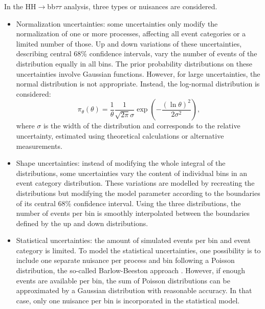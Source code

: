 \documentclass[../main.tex]{subfiles}
\begin{document}
In the HH$\to$bb$\tau\tau$ analysis, three types or nuisances are considered. 
\begin{itemize}
\item Normalization uncertainties: some uncertainties only modify the normalization of one or more processes, affecting all event categories or a limited number of those. Up and down variations of these uncertainties, describing central 68\% confidence intervals, vary the number of events of the distribution equally in all bins. The prior probability distributions on these uncertainties involve Gaussian functions. However, for large uncertainties, the normal distribution is not appropriate. Instead, the log-normal distribution is considered:
\begin{equation}
\pi_\theta(\theta) = \frac{1}{\theta}\frac{1}{\sqrt{2\pi}\sigma}\exp\left(-\frac{(\ln\theta)^2}{2\sigma^2}\right),
\end{equation}
where $\sigma$ is the width of the distribution and corresponds to the relative uncertainty, estimated using theoretical calculations or alternative measurements.

\item Shape uncertainties: instead of modifying the whole integral of the distributions, some uncertainties vary the content of individual bins in an event category distribution. These variations are modelled by recreating the distributions but modifying the model parameter according to the boundaries of its central 68\% confidence interval. Using the three distributions, the number of events per bin is smoothly interpolated between the boundaries defined by the up and down distributions.

\item Statistical uncertainties: the amount of simulated events per bin and event category is limited. To model the statistical uncertainties, one possibility is to include one separate nuisance per process and bin following a Poisson distribution, the so-called Barlow-Beeston approach  \cite{hh:results:barlow_beeston}. However, if enough events are available per bin, the sum of Poisson distributions can be approximated by a Gaussian distribution with reasonable accuracy. In that case, only one nuisance per bin is incorporated in the statistical model.
\end{itemize}




\end{document}
